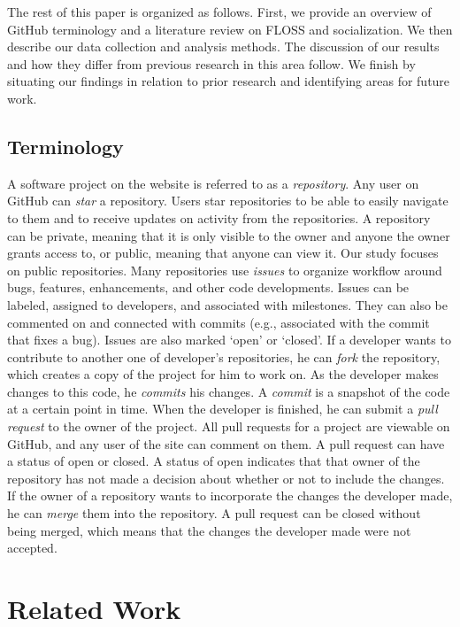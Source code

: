 \documentclass{sigchi}
\begin{document}
The rest of this paper is organized as follows. First, we provide an overview of GitHub terminology and a literature review on FLOSS and socialization. We then describe 
our data collection and analysis methods. The discussion of our results and how they differ from previous research in this
area follow. We finish by situating our findings in relation to prior research and identifying areas for future work.


\subsection{Terminology} \label{sec:terms}

A software project on the website is referred to as a \textit{repository}. Any
user on GitHub can \textit{star} a repository. Users star repositories to be
able to easily navigate to them and to receive updates on activity from the
repositories. A repository can be private, meaning that it is only visible to
the owner and anyone the owner grants access to, or public, meaning that anyone
can view it. Our study focuses on public repositories. Many repositories use \textit{issues} to organize workflow around bugs, features, enhancements, and other code 
developments. Issues can be labeled, assigned to developers, and associated with milestones. They can also be commented on and connected with commits (e.g., 
associated with the commit that fixes a bug). Issues are also marked `open' or `closed'. If a developer wants to
contribute to another one of developer's repositories, he can \textit{fork} the
repository, which creates a copy of the project for him to work on. As the
developer makes changes to this code, he \textit{commits} his changes. A
\textit{commit} is a snapshot of the code at a certain point in time. When the
developer is finished, he can submit a \textit{pull request} to the owner of the
project. All pull requests for a project are viewable on GitHub, and any user of
the site can comment on them. A pull request can have a status of open or
closed. A status of open indicates that that owner of the repository has not
made a decision about whether or not to include the changes. If the owner of a
repository wants to incorporate the changes the developer made, he can
\textit{merge} them into the repository. A pull request can be closed without
being merged, which means that the changes the developer made were not accepted.

\section{Related Work} \label{sec:relatedwork}
\end{document}
